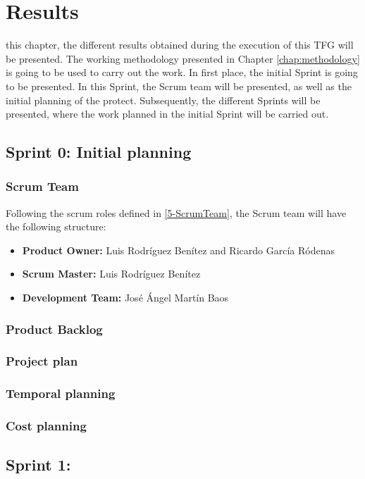 \chapter{Results} %
\label{chap:results}

 this chapter, the different results obtained during the execution of this \ac{TFG} will be presented. The working methodology presented in Chapter \ref{chap:methodology} is going to be used to carry out the work. In first place, the initial Sprint is going to be presented. In this Sprint, the Scrum team will be presented, as well as the initial planning of the protect. Subsequently, the different Sprints will be presented, where the work planned in the initial Sprint will be carried out.

\section{Sprint 0: Initial planning}


\subsection{Scrum Team}
Following the scrum roles defined in \ref{5-ScrumTeam}, the Scrum team will have the following structure:
\begin{itemize}
	\item \textbf{Product Owner:} Luis Rodríguez Benítez and Ricardo García Ródenas
	\item \textbf{Scrum Master:} Luis Rodríguez Benítez
	\item \textbf{Development Team:} José Ángel Martín Baos
\end{itemize}

\subsection{Product Backlog}

\subsection{Project plan}

\subsection{Temporal planning}

\subsection{Cost planning}



\section{Sprint 1: }